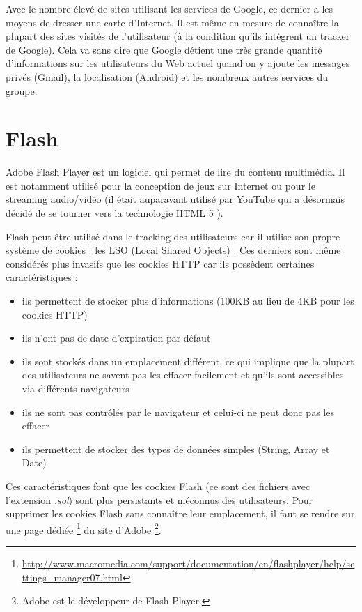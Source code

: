 Avec le nombre élevé de sites utilisant les services de Google, ce dernier a les moyens de dresser une carte d'Internet. Il est même en mesure de connaître la plupart des sites visités de l'utilisateur (à la condition qu'ils intègrent un tracker de Google). Cela va sans dire que Google détient une très grande quantité d'informations sur les utilisateurs du Web actuel quand on y ajoute les messages privés (Gmail), la localisation (Android) et les nombreux autres services du groupe.

\section{Flash}
\label{flash}
Adobe Flash Player \cite{flash_website} est un logiciel qui permet de lire du contenu multimédia. Il est notamment utilisé pour la conception de jeux sur Internet ou pour le streaming audio/vidéo (il était auparavant utilisé par YouTube qui a désormais décidé de se tourner vers la technologie HTML 5 \cite{youtube_html5}).
\newline

Flash peut être utilisé dans le tracking des utilisateurs car il utilise son propre système de cookies : les LSO (Local Shared Objects) \cite{conf/aaaiss/SoltaniCMTH10}. Ces derniers sont même considérés plus invasifs que les cookies HTTP car ils possèdent certaines caractéristiques \cite{flash_lso} :
\begin{itemize}
  \item ils permettent de stocker plus d'informations (100KB au lieu de 4KB pour les cookies HTTP)
  \item ils n'ont pas de date d'expiration par défaut
  \item ils sont stockés dans un emplacement différent, ce qui implique que la plupart des utilisateurs ne savent pas les effacer facilement et qu'ils sont accessibles via différents navigateurs
  \item ils ne sont pas contrôlés par le navigateur et celui-ci ne peut donc pas les effacer
  \item ils permettent de stocker des types de données simples (String, Array et Date)
\end{itemize}

Ces caractéristiques font que les cookies Flash (ce sont des fichiers avec l'extension \textit{.sol}) sont plus persistants et méconnus des utilisateurs. Pour supprimer les cookies Flash sans connaître leur emplacement, il faut se rendre sur une page dédiée \footnote{\url{http://www.macromedia.com/support/documentation/en/flashplayer/help/settings_manager07.html}} du site d'Adobe \footnote{Adobe est le développeur de Flash Player.}.
\newline

